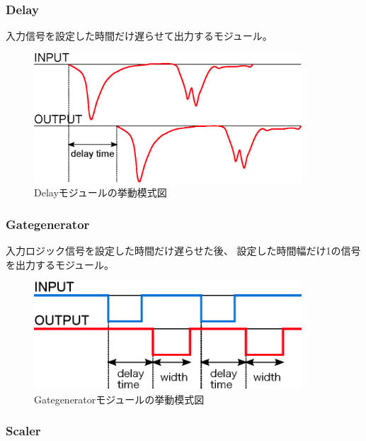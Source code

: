\documentclass{jarticle}
\begin{document}
   \subsubsection*{Delay}
    	  
    	  入力信号を設定した時間だけ遅らせて出力するモジュール。
    	  
	  \begin{figure}[H]
	   \begin{center}
	    \includegraphics[width = 100mm]{./picture/Delay.eps}
	   \end{center}
	   \caption{Delayモジュールの挙動模式図}
	   \label{Fig:Delay}
	  \end{figure}
	  
	  
   \subsubsection*{Gategenerator}
   	  
	  入力ロジック信号を設定した時間だけ遅らせた後、
	  設定した時間幅だけ1の信号を出力するモジュール。
	  
	  \begin{figure}[H]
	   \begin{center}
	    \includegraphics[width = 100mm]{./picture/Gategenerator.eps}
	   \end{center}
	   \caption{Gategeneratorモジュールの挙動模式図}
	   \label{Fig:Gategenerator}
	  \end{figure}
	  
	  
   \subsubsection*{Scaler}
	  
\end{document}

